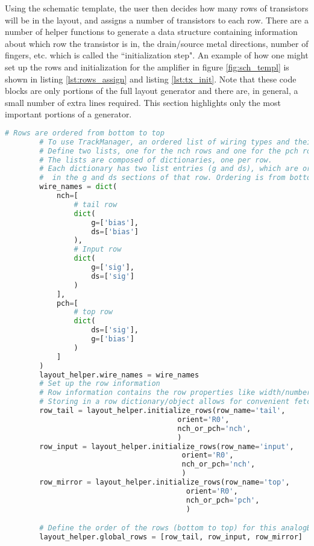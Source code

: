 Using the schematic template, the user then decides how many rows of transistors will be in the layout, and assigns a number of transistors to each row. There are a number of helper functions to generate a data structure containing information about which row the transistor is in, the drain/source metal directions, number of fingers, etc. which is called the ``initialization step". An example of how one might set up the rows and initialization for the amplifier in figure \ref{fig:sch_templ} is shown in listing \ref{lst:rows_assign} and listing \ref{lst:tx_init}. Note that these code blocks are only portions of the full layout generator and there are, in general, a small number of extra lines required. This section highlights only the most important portions of a generator.
\begin{lstlisting}[language=Python, caption=Creating rows for transistors, label={lst:rows_assign}, float]
        # Rows are ordered from bottom to top
        # To use TrackManager, an ordered list of wiring types and their locations must be provided.
        # Define two lists, one for the nch rows and one for the pch rows
        # The lists are composed of dictionaries, one per row.
        # Each dictionary has two list entries (g and ds), which are ordered lists of what wire types will be present
        #  in the g and ds sections of that row. Ordering is from bottom to top of the design.
        wire_names = dict(
            nch=[
                # tail row
                dict(
                    g=['bias'],
                    ds=['bias']
                ),
                # Input row
                dict(
                    g=['sig'],
                    ds=['sig']
                )
            ],
            pch=[
                # top row
                dict(
                    ds=['sig'],
                    g=['bias']
                )
            ]
        )
        layout_helper.wire_names = wire_names
        # Set up the row information
        # Row information contains the row properties like width/number of fins, orientation, intent, etc.
        # Storing in a row dictionary/object allows for convenient fetching of data in later functions
        row_tail = layout_helper.initialize_rows(row_name='tail',
                                        orient='R0',
                                        nch_or_pch='nch',
                                        )
        row_input = layout_helper.initialize_rows(row_name='input',
                                         orient='R0',
                                         nch_or_pch='nch',
                                         )
        row_mirror = layout_helper.initialize_rows(row_name='top',
                                          orient='R0',
                                          nch_or_pch='pch',
                                          )

        # Define the order of the rows (bottom to top) for this analogBase cell
        layout_helper.global_rows = [row_tail, row_input, row_mirror]
\end{lstlisting}
